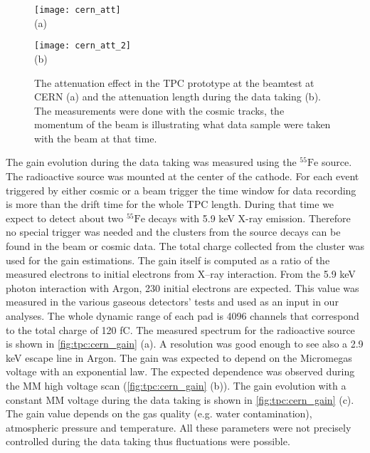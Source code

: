 \documentclass[../main.tex]{subfiles}
\begin{document}
\begin{figure}[!ht]
  \centering
  \begin{minipage}{0.49\linewidth}
    \centering
    \texttt{[image: cern\_att]} \\ (a)
  \end{minipage}
  \begin{minipage}{0.49\linewidth}
    \centering
    \texttt{[image: cern\_att\_2]} \\ (b)
  \end{minipage}
  \caption{The attenuation effect in the TPC prototype at the beamtest at CERN (a) and the attenuation length during the data taking (b). The measurements were done with the cosmic tracks, the momentum of the beam is illustrating what data sample were taken with the beam at that time.}
  \label{fig:tpc:cern_att}
\end{figure}

The gain evolution during the data taking was measured using the ${}^{55}\text{Fe}$ source. The radioactive source was mounted at the center of the cathode. For each event triggered by either cosmic or a beam trigger the time window for data recording is more than the drift time for the whole TPC length. During that time we expect to detect about two ${}^{55}\text{Fe}$ decays with 5.9 keV X-ray emission. Therefore no special trigger was needed and the clusters from the source decays can be found in the beam or cosmic data. The total charge collected from the cluster was used for the gain estimations. The gain itself is computed as a ratio of the measured electrons to initial electrons from X--ray interaction. From the 5.9 keV photon interaction with Argon, 230 initial electrons are expected. This value was measured in the various gaseous detectors' tests and used as an input in our analyses. The whole dynamic range of each pad is 4096 channels that correspond to the total charge of 120 fC. The measured spectrum for the radioactive source is shown in \autoref{fig:tpc:cern_gain} (a). A resolution was good enough to see also a 2.9 keV escape line in Argon. The gain was expected to depend on the Micromegas voltage with an exponential law. The expected dependence was observed during the MM high voltage scan (\autoref{fig:tpc:cern_gain} (b)). The gain evolution with a constant MM voltage during the data taking is shown in \autoref{fig:tpc:cern_gain} (c). The gain value depends on the gas quality (e.g. water contamination), atmospheric pressure and temperature. All these parameters were not precisely controlled during the data taking thus fluctuations were possible.
\end{document}
